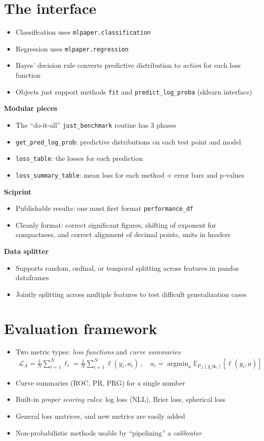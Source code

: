 \documentclass[a0,landscape]{a0poster}
\newcommand{\mysection}[1]{\section*{\fontsize{67.1}{82} \selectfont \color{NavyBlue} #1 \color{Black}}}
\renewcommand{\vec}[1]{{\boldsymbol{\mathbf{#1}}}} %
\newcommand{\E}{\mathbb{E}}
\newcommand{\Loss}{\mathcal{L}}
\newcommand{\loss}{\ell}
\DeclareMathOperator*{\argmin}{argmin}
\newcommand{\code}{\texttt}
\newcommand{\sectionx}{\textbf}
\begin{document}
\begin{multicols}{3}
\mysection{The interface}
%
\begin{itemize}
  \item Classification uses \code{mlpaper.classification}
  \item Regression uses \code{mlpaper.regression}
  \item Bayes' decision rule converts predictive distribution to \emph{action} for each loss function
  \item Objects just support methods \code{fit} and \code{predict\_log\_proba} (sklearn interface)
\end{itemize}
%
\sectionx{Modular pieces}
\begin{itemize}
  \item The ``do-it-all'' \code{just\_benchmark} routine has 3 phases
  \item \code{get\_pred\_log\_prob}: predictive distributions on each test point and model
  \item \code{loss\_table}: the losses for each prediction
  \item \code{loss\_summary\_table}: mean loss for each method $+$ error bars and p-values
\end{itemize}
%
\sectionx{Sciprint}
\begin{itemize}
  \item Publishable results: one must first format \code{performance\_df}
  \item Cleanly format: correct significant figures, shifting of exponent for compactness, and correct alignment of decimal points, units in headers
\end{itemize}
%
\sectionx{Data splitter}
\begin{itemize}
  \item Supports random, ordinal, or temporal splitting across features in pandas dataframes
  \item Jointly splitting across multiple features to test difficult generalization cases
\end{itemize}

\columnbreak

\mysection{Evaluation framework}

\begin{itemize}
  \item Two metric types: \emph{loss functions} and \emph{curve summaries}
  \begin{align}
    \Loss_A = \frac{1}{N} \sum_{i=1}^N \loss_i = \frac{1}{N} \sum_{i=1}^N \loss(y_i, a_i)\,, \quad a_i = \argmin_a \E_{P_A(y_i|\vec x_i)}[\loss(y_i, a)]
  \end{align}
  \item Curve summaries (ROC, PR, PRG) for a single number
  \item Built-in \emph{proper scoring rules}: log loss (NLL), Brier loss, spherical loss
  \item General loss matrices, and new metrics are easily added
  \item Non-probabilistic methods usable by ``pipelining'' a \emph{calibrator}
\end{itemize}


\end{multicols}
\end{document}

